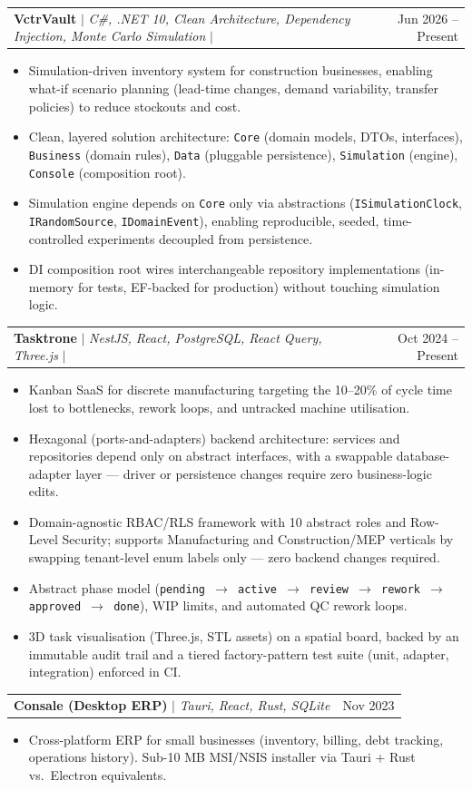 \documentclass[letterpaper,11pt]{article}
\makeatletter
\newcommand{\resumeItem}[1]{
  \item\small{#1 \vspace{-2pt}}
}
\newcommand{\resumeProjectHeading}[2]{
  \vspace{-2pt}\item
    \begin{tabular*}{0.97\textwidth}{l@{\extracolsep{\fill}}r}
      \small#1 & #2 \\
    \end{tabular*}\vspace{-7pt}
}
\newcommand{\resumeItemListStart}{\begin{itemize}}
\newcommand{\resumeItemListEnd}{\end{itemize}\vspace{-5pt}}
\makeatother
\begin{document}
    \resumeProjectHeading
      {\textbf{VctrVault} $|$ \emph{C\#, .NET 10, Clean Architecture, Dependency Injection,
      Monte Carlo Simulation}
      $|$ \href{https://github.com/AmmarElsherif2021/VctrVault}{\faGithub}}
      {Jun 2026 -- Present}
      \resumeItemListStart
        \resumeItem{Simulation-driven inventory system for construction businesses, enabling
          what-if scenario planning (lead-time changes, demand variability, transfer policies)
          to reduce stockouts and cost.}
        \resumeItem{Clean, layered solution architecture: \texttt{Core} (domain models, DTOs,
          interfaces), \texttt{Business} (domain rules), \texttt{Data} (pluggable persistence),
          \texttt{Simulation} (engine), \texttt{Console} (composition root).}
        \resumeItem{Simulation engine depends on \texttt{Core} only via abstractions
          (\texttt{ISimulationClock}, \texttt{IRandomSource}, \texttt{IDomainEvent}), enabling
          reproducible, seeded, time-controlled experiments decoupled from persistence.}
        \resumeItem{DI composition root wires interchangeable repository implementations
          (in-memory for tests, EF-backed for production) without touching simulation logic.}
      \resumeItemListEnd

    \resumeProjectHeading
      {\textbf{Tasktrone} $|$ \emph{NestJS, React, PostgreSQL, React Query, Three.js}
      $|$ \href{https://github.com/AmmarElsherif2021/tasktrone}{\faGithub}}
      {Oct 2024 -- Present}
      \resumeItemListStart
        \resumeItem{Kanban SaaS for discrete manufacturing targeting the 10--20\% of cycle time
          lost to bottlenecks, rework loops, and untracked machine utilisation.}
        \resumeItem{Hexagonal (ports-and-adapters) backend architecture: services and repositories
          depend only on abstract interfaces, with a swappable database-adapter layer ---
          driver or persistence changes require zero business-logic edits.}
        \resumeItem{Domain-agnostic RBAC/RLS framework with 10 abstract roles and Row-Level
          Security; supports Manufacturing and Construction/MEP verticals by swapping
          tenant-level enum labels only --- zero backend changes required.}
        \resumeItem{Abstract phase model (\texttt{pending $\rightarrow$ active $\rightarrow$
          review $\rightarrow$ rework $\rightarrow$ approved $\rightarrow$ done}), WIP limits,
          and automated QC rework loops.}
        \resumeItem{3D task visualisation (Three.js, STL assets) on a spatial board, backed by an
          immutable audit trail and a tiered factory-pattern test suite (unit, adapter,
          integration) enforced in CI.}
      \resumeItemListEnd
    \resumeProjectHeading
      {\textbf{Consale (Desktop ERP)} $|$ \emph{Tauri, React, Rust, SQLite}}
      {Nov 2023}
      \resumeItemListStart
        \resumeItem{Cross-platform ERP for small businesses (inventory, billing, debt tracking,
          operations history). Sub-10 MB MSI/NSIS installer via Tauri + Rust vs.\ Electron equivalents.}
      \resumeItemListEnd
\end{document}
